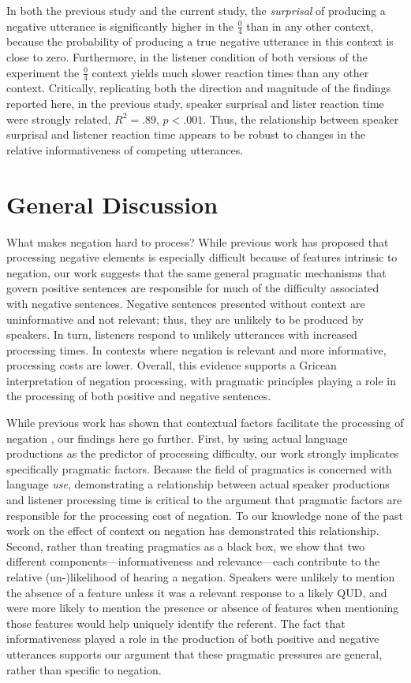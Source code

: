 \documentclass[man, floatsintext, noapacite]{apa6}
\begin{document}
In both the previous study and the current study, the \textit{surprisal} of producing a negative utterance is significantly higher in the $\frac{0}{4}$ than in any other context, because the probability of producing a true negative utterance in this context is close to zero. Furthermore, in the listener condition of both versions of the experiment the $\frac{0}{4}$ context yields much slower reaction times than any other context. Critically, replicating both the direction and magnitude of the findings reported here, in the previous study, speaker surprisal and lister reaction time were strongly related, $R^2=.89$, $p<.001$. Thus, the relationship between speaker surprisal and listener reaction time appears to be robust to changes in the relative informativeness of competing utterances. 

\section{General Discussion}

What makes negation hard to process? While previous work has proposed that processing negative elements is especially difficult because of features intrinsic to negation, our work suggests that the same general pragmatic mechanisms that govern positive sentences are responsible for much of the difficulty associated with negative sentences. Negative sentences presented without context are uninformative and not relevant; thus, they are unlikely to be produced by speakers. In turn, listeners respond to unlikely utterances with increased processing times. In contexts where negation is relevant and more informative, processing costs are lower. Overall, this evidence supports a Gricean interpretation of negation processing, with pragmatic principles playing a role in the processing of both positive and negative sentences.

While previous work has shown that contextual factors facilitate the processing of negation \cite{wason1965,nieuwland2008,dale2011,orenes2014}, our findings here go further. First, by using actual language productions as the predictor of processing difficulty, our work strongly implicates specifically pragmatic factors. Because the field of pragmatics is concerned with language \textit{use}, demonstrating a relationship between actual speaker productions and listener processing time is critical to the argument that pragmatic factors are responsible for the processing cost of negation. To our knowledge none of the past work on the effect of context on negation has demonstrated this relationship. Second, rather than treating pragmatics as a black box, we show that two different components---informativeness and relevance---each contribute to the relative (un-)likelihood of hearing a negation. Speakers were unlikely to mention the absence of a feature unless it was a relevant response to a likely QUD, and were more likely to mention the presence or absence of features when mentioning those features would help uniquely identify the referent. The fact that informativeness played a role in the production of both positive and negative utterances supports our argument that these pragmatic pressures are general, rather than specific to negation. 
\end{document}
